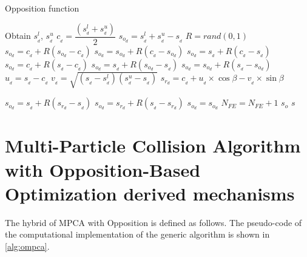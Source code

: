 \begin{algorithm}[H]
\centering
\caption{Opposition function}
\label{alg:3}
\footnotesize
\begin{algorithmic}[1]
\State Obtain $ s^l_{_d} $, $ s^u_{_d} $
\State $ c_{_d} = \dfrac{\left( s^l_{_d} + s^u_{_d} \right)}{2} $ 
\State $ s_{o_d}  = s^l_{_d} + s^u_{_d} - s_{_d} $
\State $ R = rand(0,1) $
\State $ s_{o_d} = c_{_d} + R \left(s_{o_d} - c_{_d} \right) $
\Else
\State $ s_{o_d} = s_{o_d} + R \left(c_{_d} - s_{o_d} \right) $
\EndIf
\EndCase
{}
\State $ s_{o_d} = s_{_d} + R \left(c_{_d} - s_{_d} \right) $
\Else
\State $ s_{o_d} = c_{_d} + R \left(s_{_d} - c_{_d} \right) $
\EndIf
\EndCase
{}
\State $ s_{o_d} = s_{_d} + R \left(s_{o_d} - s_{_d} \right) $
\Else
\State $ s_{o_d} = s_{o_d} + R \left(s_{_d} - s_{o_d} \right) $
\EndIf
\EndCase
{}
\State $ u_{_d} = s_{_d} - c_{_d} $
\State $ v_{_d} = \sqrt{\left(s_{_d} - s^l_{_d} \right)\left( s^u_{_d} - s_{_d} \right)} $
\State $ s_{r_d} = c_{_d} + u_{_d} \times \cos \beta - v_{_d} \times \sin \beta$

\State $ s_{o_d} = s_{_d} + R \left(s_{r_d} - s_{_d} \right) $
\Else
\State $ s_{o_d} = s_{r_d} + R \left(s_{_d} - s_{r_d} \right) $
\EndIf
\EndCase
\Default {}
\State $ s_{o_d} =  s_{o_d} $
\EndDefault
\EndSwitch
\EndFor
\State $N_{FE} = N_{FE} + 1$
\State \Return $s_o$
\Else
\State \Return $s$
\EndIf
\EndFunction
\end{algorithmic}
\end{algorithm}

\section{Multi-Particle Collision Algorithm with Opposition-Based Optimization derived mechanisms}
\setcounter{equation}{0}
\label{sec:4}

The hybrid of MPCA with Opposition is defined as follows. The pseudo-code of the computational implementation of the generic algorithm is shown in \autoref{alg:ompca}.

